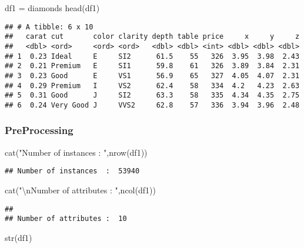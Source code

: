 \documentclass[
]{article}
\newenvironment{Shaded}{\begin{snugshade}}{\end{snugshade}}
\newcommand{\FunctionTok}[1]{\textcolor[rgb]{0.00,0.00,0.00}{#1}}
\newcommand{\NormalTok}[1]{#1}
\newcommand{\OtherTok}[1]{\textcolor[rgb]{0.56,0.35,0.01}{#1}}
\newcommand{\SpecialCharTok}[1]{\textcolor[rgb]{0.00,0.00,0.00}{#1}}
\newcommand{\StringTok}[1]{\textcolor[rgb]{0.31,0.60,0.02}{#1}}
\begin{document}
\begin{Shaded}
\begin{Highlighting}[]
\NormalTok{df1 }\OtherTok{=}\NormalTok{ diamonds}
\FunctionTok{head}\NormalTok{(df1)}
\end{Highlighting}
\end{Shaded}

\begin{verbatim}
## # A tibble: 6 x 10
##   carat cut       color clarity depth table price     x     y     z
##   <dbl> <ord>     <ord> <ord>   <dbl> <dbl> <int> <dbl> <dbl> <dbl>
## 1  0.23 Ideal     E     SI2      61.5    55   326  3.95  3.98  2.43
## 2  0.21 Premium   E     SI1      59.8    61   326  3.89  3.84  2.31
## 3  0.23 Good      E     VS1      56.9    65   327  4.05  4.07  2.31
## 4  0.29 Premium   I     VS2      62.4    58   334  4.2   4.23  2.63
## 5  0.31 Good      J     SI2      63.3    58   335  4.34  4.35  2.75
## 6  0.24 Very Good J     VVS2     62.8    57   336  3.94  3.96  2.48
\end{verbatim}

\hypertarget{preprocessing}{%
\subsubsection{PreProcessing}\label{preprocessing}}

\begin{Shaded}
\begin{Highlighting}[]
\FunctionTok{cat}\NormalTok{(}\StringTok{"Number of instances  : "}\NormalTok{,}\FunctionTok{nrow}\NormalTok{(df1))}
\end{Highlighting}
\end{Shaded}

\begin{verbatim}
## Number of instances  :  53940
\end{verbatim}

\begin{Shaded}
\begin{Highlighting}[]
\FunctionTok{cat}\NormalTok{(}\StringTok{"}\SpecialCharTok{\textbackslash{}n}\StringTok{Number of attributes : "}\NormalTok{,}\FunctionTok{ncol}\NormalTok{(df1))}
\end{Highlighting}
\end{Shaded}

\begin{verbatim}
## 
## Number of attributes :  10
\end{verbatim}

\begin{Shaded}
\begin{Highlighting}[]
\FunctionTok{str}\NormalTok{(df1)}
\end{Highlighting}
\end{Shaded}
\end{document}

